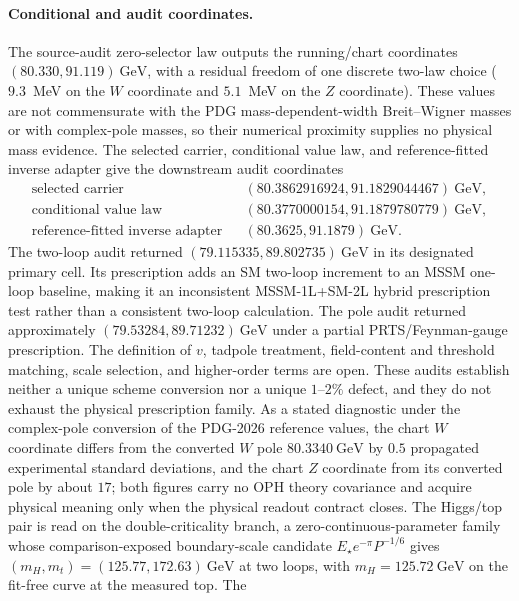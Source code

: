 \documentclass[11pt]{article}
\begin{document}
\paragraph{Conditional and audit coordinates.}
The source-audit zero-selector law outputs the running/chart coordinates
\((80.330,91.119)~\mathrm{GeV}\), with a residual freedom of one discrete
two-law choice (\(9.3\)~MeV on the \(W\) coordinate and \(5.1\)~MeV on the \(Z\)
coordinate). These values are not commensurate with the PDG mass-dependent-width
Breit--Wigner masses or with complex-pole masses, so their numerical proximity supplies no
physical mass evidence. The selected
carrier, conditional value law, and reference-fitted inverse adapter give the
downstream audit coordinates
\[
\begin{array}{rcl}
\text{selected carrier} && (80.3862916924,91.1829044467)~\mathrm{GeV},\\
\text{conditional value law} && (80.3770000154,91.1879780779)~\mathrm{GeV},\\
\text{reference-fitted inverse adapter} && (80.3625,91.1879)~\mathrm{GeV}.
\end{array}
\]
The two-loop audit returned \((79.115335,89.802735)~\mathrm{GeV}\) in its designated primary
cell. Its prescription adds an SM two-loop increment to an MSSM one-loop baseline, making it an
inconsistent MSSM-1L+SM-2L hybrid prescription test rather than a consistent two-loop
calculation. The pole audit returned approximately
\((79.53284,89.71232)~\mathrm{GeV}\) under a partial PRTS/Feynman-gauge prescription. The
definition of \(v\), tadpole treatment, field-content and threshold matching, scale selection,
and higher-order terms are open. These audits establish neither a unique scheme conversion
nor a unique \(1\)--\(2\%\) defect, and they do not exhaust the physical prescription family.
As a stated diagnostic under the complex-pole conversion of the PDG-2026 reference values, the
chart \(W\) coordinate differs from the converted \(W\) pole \(80.3340~\mathrm{GeV}\) by \(0.5\)
propagated experimental standard deviations, and the chart \(Z\) coordinate from its converted
pole by about \(17\); both figures carry no OPH theory covariance and acquire physical meaning
only when the physical readout contract closes.
The Higgs/top pair is read on the double-criticality branch, a
zero-continuous-parameter family whose comparison-exposed boundary-scale
candidate \(E_\star e^{-\pi}P^{-1/6}\) gives
\((m_H,m_t)=(125.77,172.63)~\mathrm{GeV}\) at two loops, with
\(m_H=125.72~\mathrm{GeV}\) on the fit-free curve at the measured top. The
\end{document}
